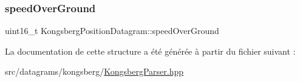 \subsubsection{\texorpdfstring{speed\+Over\+Ground}{speedOverGround}}
{\footnotesize\ttfamily uint16\+\_\+t Kongsberg\+Position\+Datagram\+::speed\+Over\+Ground}



La documentation de cette structure a été générée à partir du fichier suivant \+:\begin{DoxyCompactItemize}
\item 
src/datagrams/kongsberg/\hyperlink{KongsbergParser_8hpp}{Kongsberg\+Parser.\+hpp}\end{DoxyCompactItemize}
